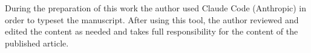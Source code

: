 During the preparation of this work the author used Claude Code (Anthropic) in order to typeset the manuscript.
After using this tool, the author reviewed and edited the content as needed and takes full responsibility for the content of the published article.
